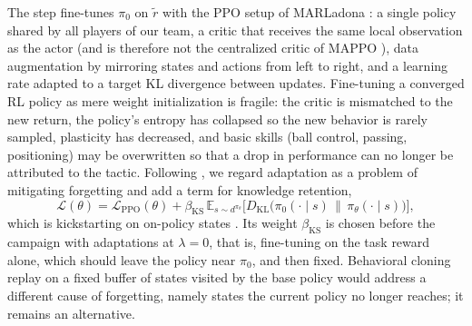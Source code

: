 \documentclass[11pt]{article}
\newcommand{\E}{\mathbb{E}}
\newcommand{\KL}{D_{\mathrm{KL}}}
\begin{document}
The step fine-tunes $\pi_0$ on $\tilde r$ with the PPO setup of MARLadona \citep{schulman2017ppo,li2025marladona}: a single policy shared by all players of our team, a critic that receives the same local observation as the actor (and is therefore not the centralized critic of MAPPO \citep{yu2022mappo}), data augmentation by mirroring states and actions from left to right, and a learning rate adapted to a target KL divergence between updates.
Fine-tuning a converged RL policy as mere weight initialization is fragile: the critic is mismatched to the new return, the policy's entropy has collapsed so the new behavior is rarely sampled, plasticity has decreased, and basic skills (ball control, passing, positioning) may be overwritten so that a drop in performance can no longer be attributed to the tactic.
Following \citet{wolczyk2024finetuning}, we regard adaptation as a problem of mitigating forgetting and add a term for knowledge retention,
\begin{equation}
  \mathcal{L}(\theta) = \mathcal{L}_{\mathrm{PPO}}(\theta)
  + \beta_{\mathrm{KS}}\, \E_{s\sim d^{\pi_\theta}}\!\bigl[\KL\bigl(\pi_0(\cdot\mid s)\,\|\,\pi_\theta(\cdot\mid s)\bigr)\bigr],
\end{equation}
which is kickstarting on on-policy states \citep{schmitt2018kickstarting}.
Its weight $\beta_{\mathrm{KS}}$ is chosen before the campaign with adaptations at $\lambda = 0$, that is, fine-tuning on the task reward alone, which should leave the policy near $\pi_0$, and then fixed.
Behavioral cloning replay on a fixed buffer of states visited by the base policy would address a different cause of forgetting, namely states the current policy no longer reaches; it remains an alternative.
\end{document}
